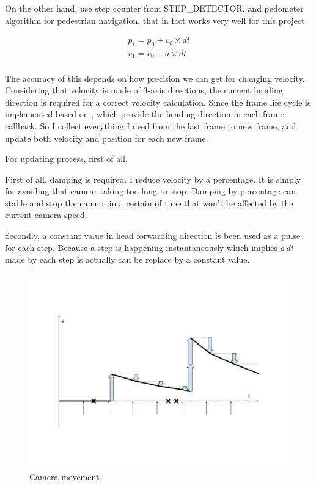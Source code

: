 On the other hand, use step counter from STEP\_DETECTOR, and pedometer algorithm for pedestrian navigation, that in fact works very well for this project.

\[
\begin{array}{lr}
p_1 = p_0 + v_0 \times dt\\
v_1 = v_0 + a \times dt\\
\end{array}
\]

The accuracy of this depends on how precision we can get for changing velocity. Considering that velocity is made of 3-axis directions, the current heading direction is required for a correct velocity calculation. Since the frame life cycle is implemented based on \parencite{google.vr-sdk.2016}, which provide the heading direction in each frame callback. So I collect everything I need from the last frame to new frame, and update both velocity and position for each new frame.

For updating process, first of all, 

First of all, damping is required. I reduce velocity by a percentage. It is simply for avoiding that camear taking too long to stop. Damping by percentage can stable and stop the camera in a certain of time that won't be affected by the current camera speed. 


Secondly, a constant value in head forwarding direction is been used as a pulse for each step. Because a step is happening instantaneously which implies $a\,dt$ made by each step is actually can be replace by a constant value.

\begin{figure}[H]
\caption[camera-movement]{Camera movement}
\label{fig:camera-movement}
\centering
\includegraphics[width=\linewidth]{Figures/camera-movement.png}
\decoRule
\end{figure}

